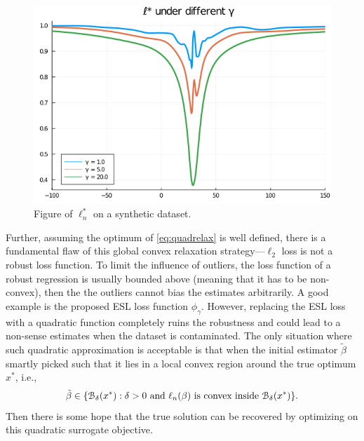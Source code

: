 \begin{figure}[t!] 
    \centering 
    \includegraphics[width = 0.8\linewidth]{figures/lstar.png}
     \caption{Figure of $\ell_n^*$ on a synthetic dataset.} \label{fig:lstar} 
\end{figure}


Further, assuming the optimum of \cref{eq:quadrelax} is well defined, there is a fundamental flaw of this global
convex relaxation strategy---$\ell_2$ loss is not a robust loss function. To limit the influence of outliers, the
loss function of a robust regression is usually bounded above (meaning that it has to be non-convex), then the the
outliers cannot bias the estimates arbitrarily. A good example is the proposed ESL loss function $\phi_\gamma$.
However, replacing the ESL loss with a quadratic function completely ruins the robustness and could lead to a
non-sense estimates when the dataset is contaminated. The only situation where such quadratic approximation is
acceptable is that when the initial estimator $\tilde{\beta}$ smartly picked such that it lies in a local convex
region around the true optimum $x^*$, i.e., 
\[ 
    \tilde \beta \in \{ \mathcal{B}_\delta(x^*): \delta >0 \text{ and }\ell_n(\beta) \text{ is convex inside } \mathcal{B}_\delta(x^*)\}. 
\] 
Then there is some hope that the true solution can be
recovered by optimizing on this quadratic surrogate objective.

